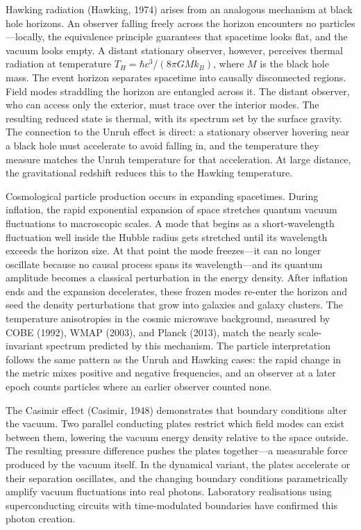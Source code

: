 Hawking radiation (Hawking, 1974) arises from an analogous mechanism at black hole horizons. An observer falling freely across the horizon encounters no particles—locally, the equivalence principle guarantees that spacetime looks flat, and the vacuum looks empty. A distant stationary observer, however, perceives thermal radiation at temperature $T_H = \hbar c^3/(8\pi G M k_B)$, where $M$ is the black hole mass. The event horizon separates spacetime into causally disconnected regions. Field modes straddling the horizon are entangled across it. The distant observer, who can access only the exterior, must trace over the interior modes. The resulting reduced state is thermal, with its spectrum set by the surface gravity. The connection to the Unruh effect is direct: a stationary observer hovering near a black hole must accelerate to avoid falling in, and the temperature they measure matches the Unruh temperature for that acceleration. At large distance, the gravitational redshift reduces this to the Hawking temperature.

Cosmological particle production occurs in expanding spacetimes. During inflation, the rapid exponential expansion of space stretches quantum vacuum fluctuations to macroscopic scales. A mode that begins as a short-wavelength fluctuation well inside the Hubble radius gets stretched until its wavelength exceeds the horizon size. At that point the mode freezes—it can no longer oscillate because no causal process spans its wavelength—and its quantum amplitude becomes a classical perturbation in the energy density. After inflation ends and the expansion decelerates, these frozen modes re-enter the horizon and seed the density perturbations that grow into galaxies and galaxy clusters. The temperature anisotropies in the cosmic microwave background, measured by COBE (1992), WMAP (2003), and Planck (2013), match the nearly scale-invariant spectrum predicted by this mechanism. The particle interpretation follows the same pattern as the Unruh and Hawking cases: the rapid change in the metric mixes positive and negative frequencies, and an observer at a later epoch counts particles where an earlier observer counted none.

The Casimir effect (Casimir, 1948) demonstrates that boundary conditions alter the vacuum. Two parallel conducting plates restrict which field modes can exist between them, lowering the vacuum energy density relative to the space outside. The resulting pressure difference pushes the plates together—a measurable force produced by the vacuum itself. In the dynamical variant, the plates accelerate or their separation oscillates, and the changing boundary conditions parametrically amplify vacuum fluctuations into real photons. Laboratory realisations using superconducting circuits with time-modulated boundaries have confirmed this photon creation.

